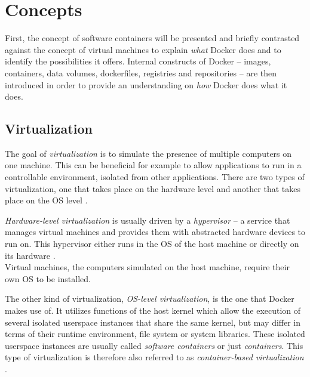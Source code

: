 
\section{Concepts} %
\label{sec:docker_concepts}

  First, the concept of software containers will be presented and briefly contrasted against the concept of virtual machines to explain \emph{what} Docker does and to identify the possibilities it offers. Internal constructs of Docker -- images, containers, data volumes, dockerfiles, registries and repositories -- are then introduced in order to provide an understanding on \emph{how} Docker does what it does.

  \subsection{Virtualization} %
  \label{sub:virtualization_and_software_containers}
    The goal of \emph{virtualization} is to simulate the presence of multiple computers on one machine. This can be beneficial for example to allow applications to run in a controllable environment, isolated from other applications. There are two types of virtualization, one that takes place on the hardware level and another that takes place on the \ac{OS} level \cite{Ruiz2015Performance}.

    \emph{Hardware-level virtualization} is usually driven by a \emph{hypervisor} -- a service that manages virtual machines and provides them with abstracted hardware devices to run on. This hypervisor either runs in the OS of the host machine or directly on its hardware \cite{Ruiz2015Performance}. \\
    Virtual machines, \ie the computers simulated on the host machine, require their own OS to be installed.

    The other kind of virtualization, \emph{OS-level virtualization}, is the one that Docker makes use of.
    It utilizes functions of the host kernel which allow the execution of several isolated userspace instances that share the same kernel, but may differ in terms of their runtime environment, \eg file system or system libraries. These isolated userspace instances are usually called \emph{software containers} or just \emph{containers}. This type of virtualization is therefore also referred to as \emph{container-based virtualization} \cite{Ruiz2015Performance}.

